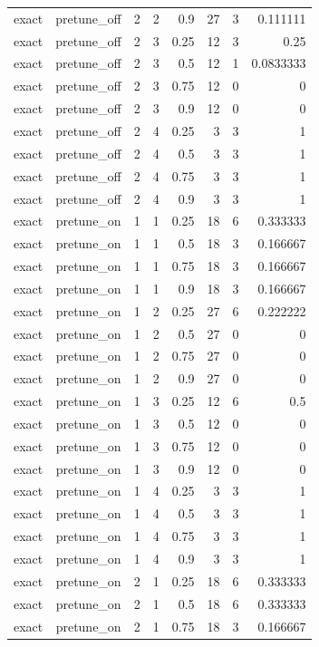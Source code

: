 \begin{table}[htbp]
\begin{tabular}{lrrrrrrr}
exact & pretune\_off & 2 & 2 & 0.9 & 27 & 3 & 0.111111 \\
exact & pretune\_off & 2 & 3 & 0.25 & 12 & 3 & 0.25 \\
exact & pretune\_off & 2 & 3 & 0.5 & 12 & 1 & 0.0833333 \\
exact & pretune\_off & 2 & 3 & 0.75 & 12 & 0 & 0 \\
exact & pretune\_off & 2 & 3 & 0.9 & 12 & 0 & 0 \\
exact & pretune\_off & 2 & 4 & 0.25 & 3 & 3 & 1 \\
exact & pretune\_off & 2 & 4 & 0.5 & 3 & 3 & 1 \\
exact & pretune\_off & 2 & 4 & 0.75 & 3 & 3 & 1 \\
exact & pretune\_off & 2 & 4 & 0.9 & 3 & 3 & 1 \\
exact & pretune\_on & 1 & 1 & 0.25 & 18 & 6 & 0.333333 \\
exact & pretune\_on & 1 & 1 & 0.5 & 18 & 3 & 0.166667 \\
exact & pretune\_on & 1 & 1 & 0.75 & 18 & 3 & 0.166667 \\
exact & pretune\_on & 1 & 1 & 0.9 & 18 & 3 & 0.166667 \\
exact & pretune\_on & 1 & 2 & 0.25 & 27 & 6 & 0.222222 \\
exact & pretune\_on & 1 & 2 & 0.5 & 27 & 0 & 0 \\
exact & pretune\_on & 1 & 2 & 0.75 & 27 & 0 & 0 \\
exact & pretune\_on & 1 & 2 & 0.9 & 27 & 0 & 0 \\
exact & pretune\_on & 1 & 3 & 0.25 & 12 & 6 & 0.5 \\
exact & pretune\_on & 1 & 3 & 0.5 & 12 & 0 & 0 \\
exact & pretune\_on & 1 & 3 & 0.75 & 12 & 0 & 0 \\
exact & pretune\_on & 1 & 3 & 0.9 & 12 & 0 & 0 \\
exact & pretune\_on & 1 & 4 & 0.25 & 3 & 3 & 1 \\
exact & pretune\_on & 1 & 4 & 0.5 & 3 & 3 & 1 \\
exact & pretune\_on & 1 & 4 & 0.75 & 3 & 3 & 1 \\
exact & pretune\_on & 1 & 4 & 0.9 & 3 & 3 & 1 \\
exact & pretune\_on & 2 & 1 & 0.25 & 18 & 6 & 0.333333 \\
exact & pretune\_on & 2 & 1 & 0.5 & 18 & 6 & 0.333333 \\
exact & pretune\_on & 2 & 1 & 0.75 & 18 & 3 & 0.166667 \\

\end{tabular}
\end{table}
